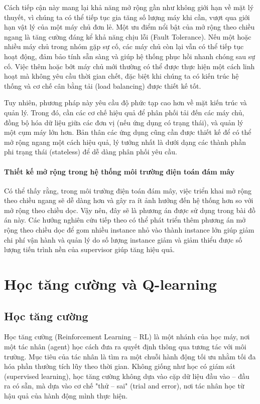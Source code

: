 Cách tiếp cận này mang lại khả năng mở rộng gần như không giới hạn về mặt lý thuyết, vì chúng ta có thể tiếp tục gia tăng số lượng máy khi cần, vượt qua giới hạn vật lý của một máy chủ đơn lẻ. Một ưu điểm nổi bật của mở rộng theo chiều ngang là tăng cường đáng kể khả năng chịu lỗi (Fault Tolerance). Nếu một hoặc nhiều máy chủ trong nhóm gặp sự cố, các máy chủ còn lại vẫn có thể tiếp tục hoạt động, đảm bảo tính sẵn sàng và giúp hệ thống phục hồi nhanh chóng sau sự cố. Việc thêm hoặc bớt máy chủ mới thường có thể được thực hiện một cách linh hoạt mà không yêu cầu thời gian chết, đặc biệt khi chúng ta có kiến trúc hệ thống và cơ chế cân bằng tải (load balancing) được thiết kế tốt.

Tuy nhiên, phương pháp này yêu cầu độ phức tạp cao hơn về mặt kiến trúc và quản lý. Trong đó, cần các cơ chế hiệu quả để phân phối tải đến các máy chủ, đồng bộ hóa dữ liệu giữa các đơn vị (nếu ứng dụng có trạng thái), và quản lý một cụm máy lớn hơn. Bản thân các ứng dụng cũng cần được thiết kế để có thể mở rộng ngang một cách hiệu quả, lý tưởng nhất là dưới dạng các thành phần phi trạng thái (stateless) để dễ dàng phân phối yêu cầu.

\paragraph{Thiết kế mở rộng trong hệ thống môi trường điện toán đám mây} Có thể thấy rằng, trong môi trường điện toán đám mây, việc triển khai mở rộng theo chiều ngang sẽ dễ dàng hơn và gây ra ít ảnh hưởng đến hệ thống hơn so với mở rộng theo chiều dọc. Vậy nên, đây sẽ là phương án được sử dụng trong bài đồ án này. Các hướng nghiên cứu tiếp theo có thể phát triển thêm phương án mở rộng theo chiều dọc để gom nhiều instance nhỏ vào thành instance lớn giúp giảm chi phí vận hành và quản lý do số lượng instance giảm và giảm thiểu được số lượng tiến trình nền của supervisor giúp tăng hiệu quả.

\section{Học tăng cường và Q-learning}

\subsection{Học tăng cường}

Học tăng cường (Reinforcement Learning – RL) là một nhánh của học máy, nơi một tác nhân (agent) học cách đưa ra quyết định thông qua tương tác với môi trường. Mục tiêu của tác nhân là tìm ra một chuỗi hành động tối ưu nhằm tối đa hóa phần thưởng tích lũy theo thời gian. Không giống như học có giám sát (supervised learning), học tăng cường không dựa vào cặp dữ liệu đầu vào – đầu ra có sẵn, mà dựa vào cơ chế "thử – sai" (trial and error), nơi tác nhân học từ hậu quả của hành động mình thực hiện.

